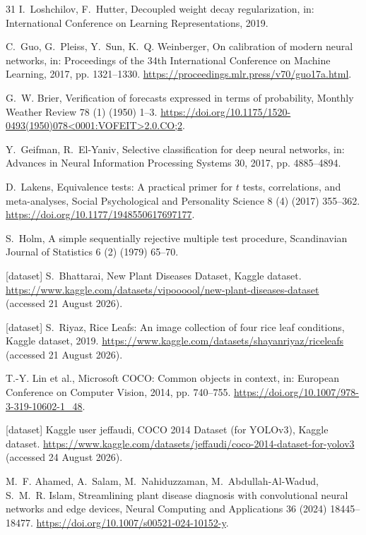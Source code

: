 \documentclass[preprint,12pt]{elsarticle}
\begin{document}
\begin{thebibliography}{31}
I.~Loshchilov, F.~Hutter, Decoupled weight decay regularization, in:
International Conference on Learning Representations, 2019.

C.~Guo, G.~Pleiss, Y.~Sun, K.~Q. Weinberger, On calibration of modern neural
networks, in: Proceedings of the 34th International Conference on Machine
Learning, 2017, pp. 1321--1330.
\url{https://proceedings.mlr.press/v70/guo17a.html}.

G.~W. Brier, Verification of forecasts expressed in terms of probability,
Monthly Weather Review 78 (1) (1950) 1--3.
\url{https://doi.org/10.1175/1520-0493(1950)078<0001:VOFEIT>2.0.CO;2}.

Y.~Geifman, R.~El-Yaniv, Selective classification for deep neural networks,
in: Advances in Neural Information Processing Systems 30, 2017,
pp. 4885--4894.

D.~Lakens, Equivalence tests: A practical primer for $t$ tests, correlations,
and meta-analyses, Social Psychological and Personality Science 8 (4) (2017)
355--362. \url{https://doi.org/10.1177/1948550617697177}.

S.~Holm, A simple sequentially rejective multiple test procedure,
Scandinavian Journal of Statistics 6 (2) (1979) 65--70.

[dataset] S.~Bhattarai, New Plant Diseases Dataset, Kaggle dataset.
\url{https://www.kaggle.com/datasets/vipoooool/new-plant-diseases-dataset}
(accessed 21 August 2026).

[dataset] S.~Riyaz, Rice Leafs: An image collection of four rice leaf
conditions, Kaggle dataset, 2019.
\url{https://www.kaggle.com/datasets/shayanriyaz/riceleafs}
(accessed 21 August 2026).

T.-Y. Lin et al., Microsoft COCO: Common objects in context, in: European
Conference on Computer Vision, 2014, pp. 740--755.
\url{https://doi.org/10.1007/978-3-319-10602-1_48}.

[dataset] Kaggle user jeffaudi, COCO 2014 Dataset (for YOLOv3), Kaggle dataset.
\url{https://www.kaggle.com/datasets/jeffaudi/coco-2014-dataset-for-yolov3}
(accessed 24 August 2026).

M.~F. Ahamed, A.~Salam, M.~Nahiduzzaman, M.~Abdullah-Al-Wadud,
S.~M.~R. Islam, Streamlining plant disease diagnosis with convolutional neural
networks and edge devices, Neural Computing and Applications 36 (2024)
18445--18477. \url{https://doi.org/10.1007/s00521-024-10152-y}.


\end{thebibliography}
\end{document}
